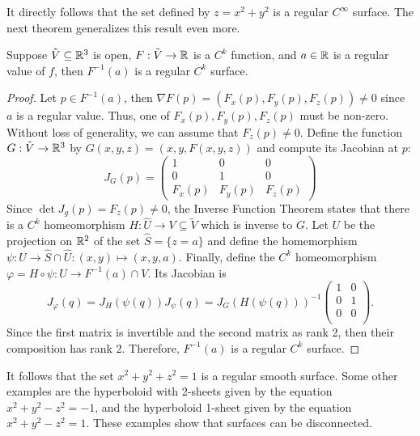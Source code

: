 It directly follows that the set defined by $z = x^2 + y^2$ is a regular $C^{\infty}$ surface. The next theorem generalizes this result even more.

\begin{proposition}
    Suppose $\tilde{V} \subseteq \mathbb{R}^3$ is open, $F : \tilde{V} \to \mathbb{R}$ is a $C^k$ function, and $a \in \mathbb{R}$ is a regular value of $f$, then $F^{-1}(a)$ is a regular $C^k$ surface.
\end{proposition}

\begin{proof}
    Let $p \in F^{-1}(a)$, then $\nabla F(p) = (F_x(p), F_y(p), F_z(p)) \neq 0$ since $a$ is a regular value. Thus, one of $F_x(p), F_y(p), F_z(p)$ must be non-zero. Without loss of generality, we can assume that $F_z(p) \neq 0$. Define the function $G : \tilde{V} \to \mathbb{R}^3$ by $G(x,y,z) = (x,y,F(x,y,z))$ and compute its Jacobian at $p$:
    $$J_G(p) = \begin{pmatrix}
        1 & 0 & 0 \\
        0 & 1 & 0 \\
        F_x(p) & F_y(p) & F_z(p)
    \end{pmatrix}$$
    Since $\det J_g(p) = F_z(p) \neq 0$, the Inverse Function Theorem states that there is a $C^k$ homeomorphism $H : \hat{U} \to V \subseteq \tilde{V}$ which is inverse to $G$. Let $U$ be the projection on $\mathbb{R}^2$ of the set $\hat{S} = \{z = a\}$ and define the homemorphism $\psi : U \to \hat{S} \cap \hat{U} : (x,y) \mapsto (x,y,a)$. Finally, define the $C^k$ homeomorphism $\varphi = H \circ \psi : U \to F^{-1}(a) \cap V$. Its Jacobian is 
    $$J_{\varphi}(q) = J_H(\psi(q))J_{\psi}(q) =J_G(H(\psi(q)))^{-1}\begin{pmatrix}
        1 & 0 \\
        0 & 1 \\
        0 & 0 \\
    \end{pmatrix}.$$
    Since the first matrix is invertible and the second matrix as rank 2, then their composition has rank 2. Therefore, $F^{-1}(a)$ is a regular $C^k$ surface.
\end{proof}

It follows that the set $x^2 + y^2 + z^2 = 1$ is a regular smooth surface. Some other examples are the hyperboloid with 2-sheets given by the equation $x^2 + y^2 - z^2 = -1$, and the hyperboloid 1-sheet given by the equation $x^2 + y^2 - z^2 = 1$. These examples show that surfaces can be disconnected. 

